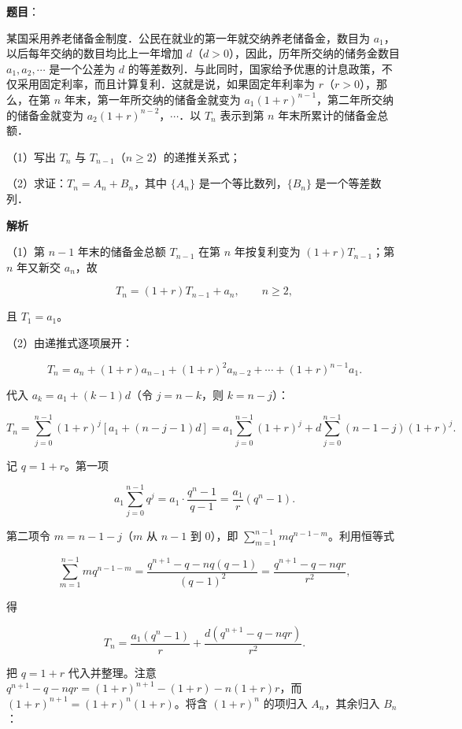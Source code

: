 \begin{answer}

\textbf{题目}：

某国采用养老储备金制度．公民在就业的第一年就交纳养老储备金，数目为 $a_1$，以后每年交纳的数目均比上一年增加 $d$（$d>0$），因此，历年所交纳的储务金数目 $a_1,a_2,\cdots$ 是一个公差为 $d$ 的等差数列．与此同时，国家给予优惠的计息政策，不仅采用固定利率，而且计算复利．这就是说，如果固定年利率为 $r$（$r>0$），那么，在第 $n$ 年末，第一年所交纳的储备金就变为 $a_1(1+r)^{n-1}$，第二年所交纳的储备金就变为 $a_2(1+r)^{n-2}$，$\cdots$．以 $T_n$ 表示到第 $n$ 年末所累计的储备金总额．

（1）写出 $T_n$ 与 $T_{n-1}$（$n\geqslant2$）的递推关系式；

（2）求证：$T_n=A_n+B_n$，其中 $\{A_n\}$ 是一个等比数列，$\{B_n\}$ 是一个等差数列．

\textbf{解析}

（1）第 $n-1$ 年末的储备金总额 $T_{n-1}$ 在第 $n$ 年按复利变为 $(1+r)T_{n-1}$；第 $n$ 年又新交 $a_n$，故

\nopagebreak[4]
\[T_n=(1+r)T_{n-1}+a_n,\qquad n\geqslant2,\]

且 $T_1=a_1$。

（2）由递推式逐项展开：

\nopagebreak[4]
\[T_n=a_n+(1+r)a_{n-1}+(1+r)^2a_{n-2}+\cdots+(1+r)^{n-1}a_1.\]

代入 $a_k=a_1+(k-1)d$（令 $j=n-k$，则 $k=n-j$）：

\nopagebreak[4]
\[T_n=\sum_{j=0}^{n-1}(1+r)^j\left[a_1+(n-j-1)d\right]=a_1\sum_{j=0}^{n-1}(1+r)^j+d\sum_{j=0}^{n-1}(n-1-j)(1+r)^j.\]

记 $q=1+r$。第一项

\nopagebreak[4]
\[a_1\sum_{j=0}^{n-1}q^j=a_1\cdot\frac{q^n-1}{q-1}=\frac{a_1}{r}(q^n-1).\]

第二项令 $m=n-1-j$（$m$ 从 $n-1$ 到 $0$），即 $\sum_{m=1}^{n-1}m q^{n-1-m}$。利用恒等式

\nopagebreak[4]
\[\sum_{m=1}^{n-1}m q^{n-1-m}=\frac{q^{n+1}-q-nq(q-1)}{(q-1)^2}=\frac{q^{n+1}-q-nqr}{r^2},\]

得

\nopagebreak[4]
\[T_n=\frac{a_1(q^n-1)}{r}+\frac{d\left(q^{n+1}-q-nqr\right)}{r^2}.\]

把 $q=1+r$ 代入并整理。注意 $q^{n+1}-q-nqr=(1+r)^{n+1}-(1+r)-n(1+r)r$，而 $(1+r)^{n+1}=(1+r)^n(1+r)$。将含 $(1+r)^n$ 的项归入 $A_n$，其余归入 $B_n$：


\end{answer}
